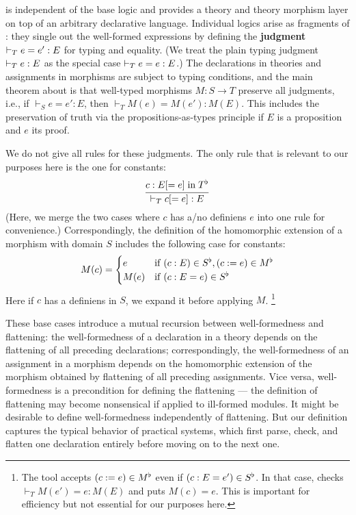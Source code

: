 \mmt is independent of the base logic and provides a theory and theory morphism layer on top of an arbitrary declarative language.
Individual logics arise as fragments of \mmt: they single out the well-formed expressions by defining the \textbf{judgment} $\vdash_T e=e':E$ for typing and equality.
(We treat the plain typing judgment $\vdash_T e:E$ as the special case $\vdash_T e=e:E$.)
The declarations in theories and assignments in morphisms are subject to typing conditions, and the main theorem about \mmt is that well-typed morphisms $M:S\to T$ preserve all judgments, i.e., if $\vdash_S e=e':E$, then $\vdash_T M(e)=M(e'):M(E)$.
This includes the preservation of truth via the propositions-as-types principle if $E$ is a proposition and $e$ its proof.

We do not give all rules for these judgments.
The only rule that is relevant to our purposes here is the one for constants:
\[\cfrac{c:E[=e] \;\mathrm{in}\; T^\flat}{\vdash_T c[=e]:E}\,\]
(Here, we merge the two cases where $c$ has a/no definiens $e$ into one rule for convenience.)
Correspondingly, the definition of the homomorphic extension of a morphism with domain $S$ includes the following case for constants:
\[M(c) = \begin{cases}e&\mathrm{if}\; (c:E) \in S^\flat, (c:=e)\in M^\flat \\ M(e) &\mathrm{if}\; (c:E=e)\in S^\flat\end{cases}\]
Here if $c$ has a definiens in $S$, we expand it before applying $M$.%
\footnote{The \mmt tool accepts $(c:=e)\in M^\flat$ even if $(c:E=e')\in S^\flat$. In that case, \mmt checks $\vdash_T M(e')=e:M(E)$ and puts $M(c)=e$. This is important for efficiency but not essential for our purposes here.}

These base cases introduce a mutual recursion between well-formedness and flattening:
the well-formedness of a declaration in a theory depends on the flattening of all preceding declarations;
correspondingly, the well-formedness of an assignment in a morphism depends on the homomorphic extension of the morphism obtained by flattening of all preceding assignments.
Vice versa, well-formedness is a precondition for defining the flattening --- the definition of flattening may become nonsensical if applied to ill-formed modules.
It might be desirable to define well-formedness independently of flattening.
But our definition captures the typical behavior of practical systems, which first parse, check, and flatten one declaration entirely before moving on to the next one.

